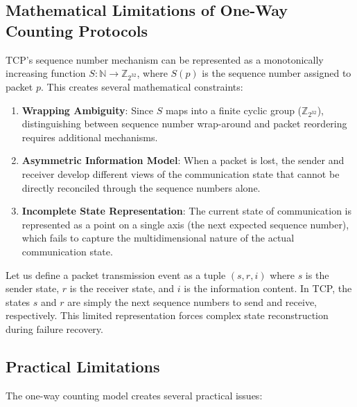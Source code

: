 \documentclass[../OAE-SPEC-MAIN.tex]{subfiles}
\begin{document}
\subsection{Mathematical Limitations of One-Way Counting Protocols}

TCP's sequence number mechanism can be represented as a monotonically increasing function $S: \mathbb{N} \rightarrow \mathbb{Z}_{2^{32}}$, where $S(p)$ is the sequence number assigned to packet $p$. This creates several mathematical constraints:

\begin{enumerate}
    \item \textbf{Wrapping Ambiguity}: Since $S$ maps into a finite cyclic group ($\mathbb{Z}_{2^{32}}$), distinguishing between sequence number wrap-around and packet reordering requires additional mechanisms.
    
    \item \textbf{Asymmetric Information Model}: When a packet is lost, the sender and receiver develop different views of the communication state that cannot be directly reconciled through the sequence numbers alone.
    
    \item \textbf{Incomplete State Representation}: The current state of communication is represented as a point on a single axis (the next expected sequence number), which fails to capture the multidimensional nature of the actual communication state.
\end{enumerate}

Let us define a packet transmission event as a tuple $(s, r, i)$ where $s$ is the sender state, $r$ is the receiver state, and $i$ is the information content. In TCP, the states $s$ and $r$ are simply the next sequence numbers to send and receive, respectively. This limited representation forces complex state reconstruction during failure recovery.

\subsection{Practical Limitations}

The one-way counting model creates several practical issues:
\end{document}
